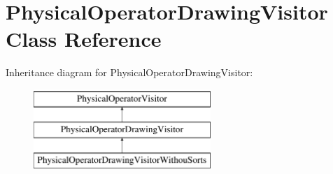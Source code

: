 \hypertarget{class_physical_operator_drawing_visitor}{\section{Physical\+Operator\+Drawing\+Visitor Class Reference}
\label{class_physical_operator_drawing_visitor}
}
Inheritance diagram for Physical\+Operator\+Drawing\+Visitor\+:\begin{figure}[H]
\begin{center}
\leavevmode
\includegraphics[height=3.000000cm]{class_physical_operator_drawing_visitor}
\end{center}
\end{figure}
